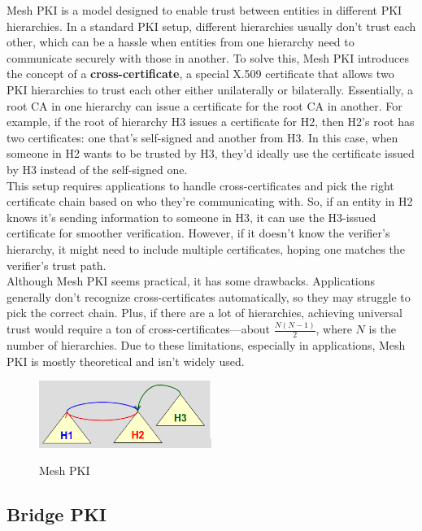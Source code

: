 Mesh PKI is a model designed to enable trust between entities in
different PKI hierarchies. In a standard PKI setup, different
hierarchies usually don't trust each other, which can be a hassle when
entities from one hierarchy need to communicate securely with those in
another. To solve this, Mesh PKI introduces the concept of a
\textbf{cross-certificate}, a special X.509 certificate that allows
two PKI hierarchies to trust each other either unilaterally or
bilaterally. Essentially, a root CA in one hierarchy can issue a
certificate for the root CA in another. For example, if the root of
hierarchy H3 issues a certificate for H2, then H2's root has two
certificates: one that's self-signed and another from H3. In this
case, when someone in H2 wants to be trusted by H3, they’d ideally use
the certificate issued by H3 instead of the self-signed one.\\
This setup requires applications to handle cross-certificates and pick
the right certificate chain based on who they’re communicating with.
So, if an entity in H2 knows it's sending information to someone in
H3, it can use the H3-issued certificate for smoother verification.
However, if it doesn’t know the verifier’s hierarchy, it might need to
include multiple certificates, hoping one matches the verifier’s trust
path.\\
Although Mesh PKI seems practical, it has some drawbacks. Applications
generally don’t recognize cross-certificates automatically, so they
may struggle to pick the correct chain. Plus, if there are a lot of
hierarchies, achieving universal trust would require a ton of
cross-certificates—about \(\frac{N(N-1)}{2}\), where \(N\) is the
number of hierarchies. Due to these limitations, especially in
applications, Mesh PKI is mostly theoretical and isn’t widely used.

\begin{figure}[H]
  \centering
  \includegraphics[width=0.5\textwidth]{img/x509 mesh pki.png}
  \label{fig:mesh PKI}

  \caption{Mesh PKI}
\end{figure}

\subsection{Bridge PKI}

